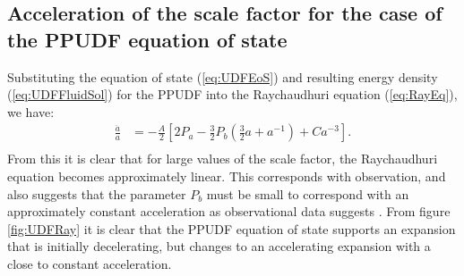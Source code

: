 \documentclass[a4paper, 11pt]{FSKH_623_Report}
\numberwithin{equation}{section}
\newcommand{\brac}[1]{\left(#1\right)}
\newcommand{\bracc}[1]{\left[#1\right]}
\begin{document}
\subsection{Acceleration of the scale factor for the case of the PPUDF equation of state}
Substituting the equation of state (\ref{eq:UDFEoS}) and resulting energy density (\ref{eq:UDFFluidSol}) for the PPUDF into the Raychaudhuri equation (\ref{eq:RayEq}), we have:
\begin{equation}\label{eq:RayUDF}
\begin{split}
\frac{\ddot{a}}{a} &= -\frac{A}{2}\bracc{2P_{a}-\frac{3}{2}P_{b}\brac{\frac{3}{2}a+a^{-1}}+Ca^{-3}}.\\
\end{split}
\end{equation}
From this it is clear that for large values of the scale factor, the Raychaudhuri equation becomes approximately linear. This corresponds with observation, and also suggests that the parameter $P_{b}$ must be small to correspond with an approximately constant acceleration as observational data suggests \citep{wang2017new}. From figure \ref{fig:UDFRay} it is clear that the PPUDF equation of state supports an expansion that is initially decelerating, but changes to an accelerating expansion with a close to constant acceleration.
\end{document}
